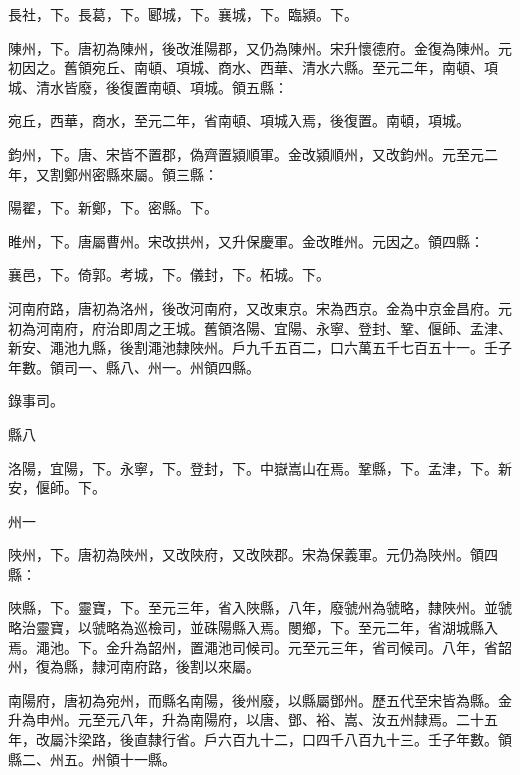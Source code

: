 \begin{pinyinscope}
 長社，下。長葛，下。郾城，下。襄城，下。臨潁。下。



 陳州，下。唐初為陳州，後改淮陽郡，又仍為陳州。宋升懷德府。金復為陳州。元初因之。舊領宛丘、南頓、項城、商水、西華、清水六縣。至元二年，南頓、項城、清水皆廢，後復置南頓、項城。領五縣：



 宛丘，西華，商水，至元二年，省南頓、項城入焉，後復置。南頓，項城。



 鈞州，下。唐、宋皆不置郡，偽齊置潁順軍。金改潁順州，又改鈞州。元至元二年，又割鄭州密縣來屬。領三縣：



 陽翟，下。新鄭，下。密縣。下。



 睢州，下。唐屬曹州。宋改拱州，又升保慶軍。金改睢州。元因之。領四縣：



 襄邑，下。倚郭。考城，下。儀封，下。柘城。下。



 河南府路，唐初為洛州，後改河南府，又改東京。宋為西京。金為中京金昌府。元初為河南府，府治即周之王城。舊領洛陽、宜陽、永寧、登封、鞏、偃師、孟津、新安、澠池九縣，後割澠池隸陜州。戶九千五百二，口六萬五千七百五十一。壬子年數。領司一、縣八、州一。州領四縣。



 錄事司。



 縣八



 洛陽，宜陽，下。永寧，下。登封，下。中嶽嵩山在焉。鞏縣，下。孟津，下。新安，偃師。下。



 州一



 陜州，下。唐初為陜州，又改陜府，又改陜郡。宋為保義軍。元仍為陜州。領四縣：



 陜縣，下。靈寶，下。至元三年，省入陜縣，八年，廢虢州為虢略，隸陜州。並虢略治靈寶，以虢略為巡檢司，並硃陽縣入焉。閿鄉，下。至元二年，省湖城縣入焉。澠池。下。金升為韶州，置澠池司候司。元至元三年，省司候司。八年，省韶州，復為縣，隸河南府路，後割以來屬。



 南陽府，唐初為宛州，而縣名南陽，後州廢，以縣屬鄧州。歷五代至宋皆為縣。金升為申州。元至元八年，升為南陽府，以唐、鄧、裕、嵩、汝五州隸焉。二十五年，改屬汴梁路，後直隸行省。戶六百九十二，口四千八百九十三。壬子年數。領縣二、州五。州領十一縣。




\end{pinyinscope}
